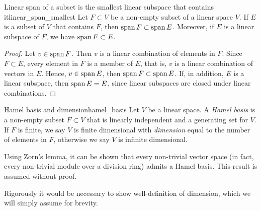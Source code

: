 \begin{proposition}{Linear span of a subset is the smallest linear subspace that contains it}{linear_span_smallest}
    Let \(F \subset V\) be a non-empty subset of a linear space \(V\). If \(E\) is a subset of \(V\) that contains \(F\), then \(\operatorname{span}{F} \subset \operatorname{span}{E}\). Moreover, if \(E\) is a linear subspace of \(F\), we have \(\operatorname{span}{F} \subset E\).
\end{proposition}
\begin{proof}
    Let \(v \in \operatorname{span}{F}\). Then \(v\) is a linear combination of elements in \(F\). Since \(F \subset E\), every element in \(F\) is a member of \(E\), that is, \(v\) is a linear combination of vectors in \(E\). Hence, \(v \in \operatorname{span}{E}\), then \(\operatorname{span}{F} \subset \operatorname{span}{E}\). If, in addition, \(E\) is a linear subspace, then \(\operatorname{span}{E} = E\), since linear subspaces are closed under linear combinations.
\end{proof}

\begin{definition}{Hamel basis and dimension}{hamel_basis}
    Let \(V\) be a linear space. A \emph{Hamel basis} is a non-empty subset \(F\subset V\) that is linearly independent and a generating set for \(V\). If \(F\) is finite, we say \(V\) is finite dimensional with \emph{dimension} equal to the number of elements in \(F\), otherwise we say \(V\) is infinite dimensional.
\end{definition}
\begin{remark}
    Using Zorn's lemma, it can be shown that every non-trivial vector space (in fact, every non-trivial module over a division ring) admits a Hamel basis. This result is assumed without proof.
\end{remark}
\begin{remark}
    Rigorously it would be necessary to show well-definition of dimension, which we will simply assume for brevity.
\end{remark}

